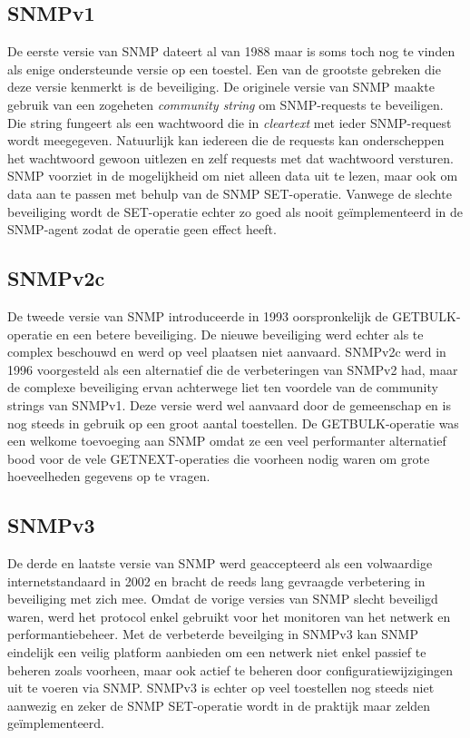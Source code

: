 \subsection{SNMPv1}
De eerste versie van SNMP dateert al van 1988 maar is soms toch nog te vinden als enige ondersteunde versie op een toestel.
Een van de grootste gebreken die deze versie kenmerkt is de beveiliging.
De originele versie van SNMP maakte gebruik van een zogeheten \emph{community string} om SNMP-requests te beveiligen.
Die string fungeert als een wachtwoord die in \textit{cleartext} met ieder SNMP-request wordt meegegeven\cite{snmp-wiki}.
Natuurlijk kan iedereen die de requests kan onderscheppen het wachtwoord gewoon uitlezen en zelf requests met dat wachtwoord versturen.
SNMP voorziet in de mogelijkheid om niet alleen data uit te lezen, maar ook om data aan te passen met behulp van de SNMP SET-operatie.
Vanwege de slechte beveiliging wordt de SET-operatie echter zo goed als nooit geïmplementeerd in de SNMP-agent zodat de operatie geen effect heeft.



\subsection{SNMPv2c}
De tweede versie van SNMP introduceerde in 1993 \cite{snmp-versions} oorspronkelijk de GETBULK-operatie en een betere beveiliging.
De nieuwe beveiliging werd echter als te complex beschouwd en werd op veel plaatsen niet aanvaard.
SNMPv2c werd in 1996 \cite{snmp-versions} voorgesteld als een alternatief die de verbeteringen van SNMPv2 had, maar de complexe beveiliging ervan achterwege liet
ten voordele van de community strings van SNMPv1.
Deze versie werd wel aanvaard door de gemeenschap en is nog steeds in gebruik op een groot aantal toestellen.
De GETBULK-operatie was een welkome toevoeging aan SNMP omdat ze een veel performanter alternatief bood voor de vele GETNEXT-operaties
die voorheen nodig waren om grote hoeveelheden gegevens op te vragen.



\subsection{SNMPv3}
De derde en laatste versie van SNMP werd geaccepteerd als een volwaardige internetstandaard in 2002 \cite{snmpv3} en
bracht de reeds lang gevraagde verbetering in beveiliging met zich mee.
Omdat de vorige versies van SNMP slecht beveiligd waren, werd het protocol enkel gebruikt voor het monitoren van het netwerk en performantiebeheer.
Met de verbeterde beveilging in SNMPv3 kan SNMP eindelijk een veilig platform aanbieden om een netwerk niet enkel passief te beheren zoals voorheen,
maar ook actief te beheren door configuratiewijzigingen uit te voeren via SNMP.
SNMPv3 is echter op veel toestellen nog steeds niet aanwezig en zeker de SNMP SET-operatie wordt in de praktijk maar zelden geïmplementeerd.

